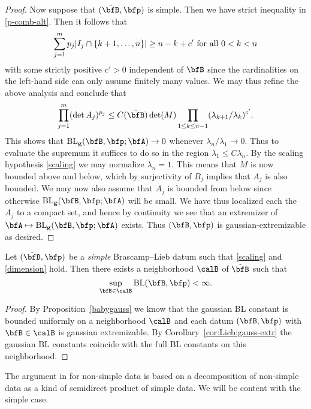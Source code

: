 \begin{proof}
Now suppose that $(\tilde{\bfB},\p)$ is simple.
Then we have strict inequality in \eqref{p-comb-alt}.
Then it follows that
\[
\sum_{j=1}^m p_j \lvert I_j \cap \{k+1,\ldots,n\}\rvert \geq n-k+c' \text{ for all } 0 < k < n
\]
with some strictly positive $c'>0$ independent of $\bfB$ since the cardinalities on the left-hand side can only assume finitely many values.
We may thus refine the above analysis and conclude that
\[ \prod_{j=1}^m (\det A_j)^{p_j}
\leq C(\tilde{\bfB})
\det(M) \prod_{1 \leq k \leq {n-1}} (\lambda_{k+1}/\lambda_k)^{c'}.\]
This shows that $\BLg( \bfB,\p; \A) \to 0$ whenever $\lambda_n / \lambda_1 \to 0$.
Thus to evaluate the supremum it suffices to do so in the region $\lambda_1 \leq C \lambda_n$.
By the scaling hypothesis \eqref{scaling} we may normalize $\lambda_n = 1$.
This means that $M$ is now bounded above and below, which by surjectivity of $B_j$ implies that $A_j$ is also bounded.
We may now also assume that $A_j$ is bounded from below since otherwise $\BLg( \bfB,\p; \A)$ will be small.
We have thus localized each the $A_j$ to a compact set, and hence by continuity we see that an extremizer of $\A \mapsto \BLg( \bfB,\p; \A)$ exists.
Thus $(\bfB,\p)$ is gaussian-extremizable as desired.
\end{proof}

\begin{corollary}
Let $(\tilde{\bfB},\p)$ be a \emph{simple} Brascamp--Lieb datum such that \eqref{scaling} and \eqref{dimension} hold.
Then there exists a neighborhood $\calB$ of $\tilde{\bfB}$ such that
\[
\sup_{\bfB \in \calB} \BL(\bfB,\p) < \infty.
\]
\end{corollary}
\begin{proof}
By Proposition~\ref{babygauss} we know that the gaussian BL constant is bounded uniformly on a neighborhood $\calB$ and each datum $(\bfB,\p)$ with $\bfB\in\calB$ is gaussian extremizable.
By Corollary~\ref{cor:Lieb:gauss-extr} the gaussian BL constants coincide with the full BL constants on this neighborhood.
\end{proof}

The argument in \cite{MR2377493} for non-simple data is based on a decomposition of non-simple data as a kind of semidirect product of simple data.
We will be content with the simple case.
